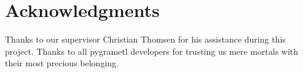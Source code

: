 \section*{Acknowledgments} %


Thanks to our supervisor Christian Thomsen for his assistance during this project. 
Thanks to all pygrametl developers for trusting us mere mortals with their most precious belonging. 